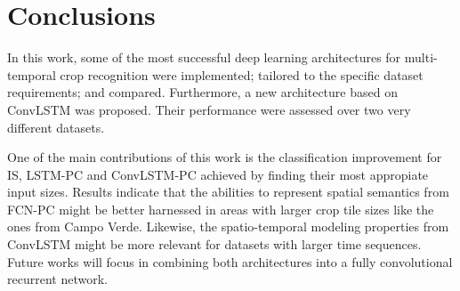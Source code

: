 
\section{Conclusions}

In this work, some of the most successful deep learning architectures for multi-temporal crop recognition were implemented; tailored to the specific dataset requirements; and compared. Furthermore, a new architecture based on ConvLSTM was proposed. Their performance were assessed over two very different datasets. %

One of the main contributions of this work is the classification improvement for IS, LSTM-PC and ConvLSTM-PC achieved by finding their most appropiate input sizes. Results indicate that the abilities to represent spatial semantics from FCN-PC might be better harnessed in areas with larger crop tile sizes like the ones from Campo Verde. Likewise, the spatio-temporal modeling properties from ConvLSTM might be more relevant for datasets with larger time sequences. Future works will focus in combining both architectures into a fully convolutional recurrent network.
